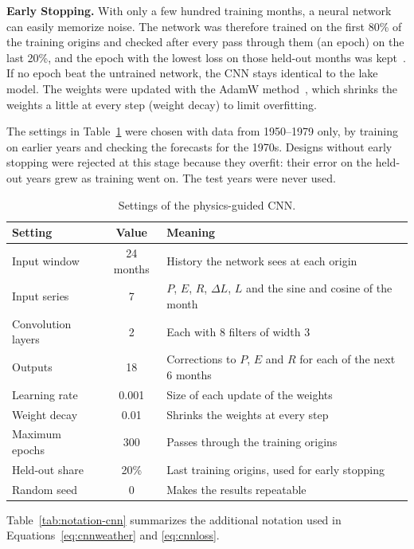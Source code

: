\documentclass{article}
\begin{document}
\textbf{Early Stopping.} With only a few hundred training months, a neural network can easily
memorize noise. The network was therefore trained on the first 80\% of the training origins and
checked after every pass through them (an epoch) on the last 20\%, and the epoch with the lowest
loss on those held-out months was kept~\cite{prechelt1998}. If no epoch beat the untrained
network, the CNN stays identical to the lake model. The weights were updated with the AdamW
method~\cite{loshchilov2019}, which shrinks the weights a little at every step (weight decay) to
limit overfitting.

The settings in Table~\ref{tab:cnnsettings} were chosen with data from 1950--1979 only, by
training on earlier years and checking the forecasts for the 1970s. Designs without early
stopping were rejected at this stage because they overfit: their error on the held-out years
grew as training went on. The test years were never used.

\begin{table}[htbp]
\centering
\caption{Settings of the physics-guided CNN.}
\label{tab:cnnsettings}
\begin{tabular}{||l|c|l||}
\hline\hline
Setting & Value & Meaning \\
\hline\hline
Input window & 24 months & History the network sees at each origin \\
Input series & 7 & $P$, $E$, $R$, $\Delta L$, $L$ and the sine and cosine of the month \\
Convolution layers & 2 & Each with 8 filters of width 3 \\
Outputs & 18 & Corrections to $P$, $E$ and $R$ for each of the next 6 months \\
Learning rate & 0.001 & Size of each update of the weights \\
Weight decay & 0.01 & Shrinks the weights at every step \\
Maximum epochs & 300 & Passes through the training origins \\
Held-out share & 20\% & Last training origins, used for early stopping \\
Random seed & 0 & Makes the results repeatable \\
\hline\hline
\end{tabular}
\end{table}

Table~\ref{tab:notation-cnn} summarizes the additional notation used in
Equations~\ref{eq:cnnweather} and \ref{eq:cnnloss}.
\end{document}
